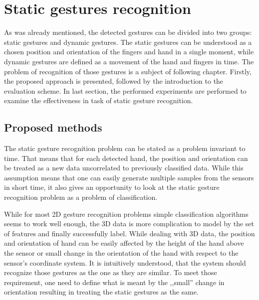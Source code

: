 
\chapter{Static gestures recognition}

As was already mentioned, the detected gestures can be divided into two groups: static gestures and dynamic gestures.
The static gestures can be understood as a chosen position and orientation of the fingers and hand in a single moment, while dynamic gestures are defined as a movement of the hand and fingers in time. 
The problem of recognition of those gestures is a subject of following chapter. 
Firstly, the proposed approach is presented, followed by the introduction to the evaluation scheme. 
In last section, the performed experiments are performed to examine the effectiveness in task of static gesture recognition.

\section{Proposed methods}

The static gesture recognition problem can be stated as a problem invariant to time.
That means that for each detected hand, the position and orientation can be treated as a new data uncorrelated to previously classified data.
While this assumption means that one can easily generate multiple samples from the sensors in short time, it also gives an opportunity to look at the static gesture recognition problem as a problem of classification.

While for most 2D gesture recognition problems simple classification algorithms seems to work well enough, the 3D data is more complication to model by the set of features and finally successfully label.
While dealing with 3D data, the position and orientation of hand can be easily affected by the height of the hand above the sensor or small change in the orientation of the hand with respect to the sensor's coordinate system. 
It is intuitively understood, that the system should recognize those gestures as the one as they are similar.
To meet those requirement, one need to define what is meant by the ,,small'' change in orientation resulting in treating the static gestures as the same.

